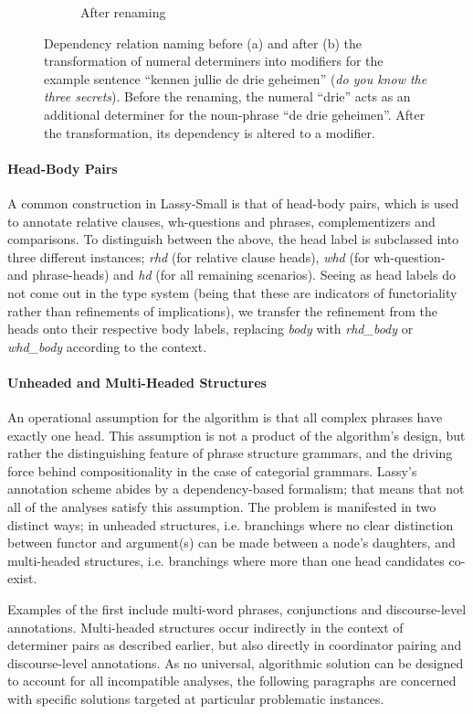 \begin{figure}[t]
\begin{subfigure}{0.49\textwidth}
        \caption{After renaming}
    \end{subfigure}
    \caption[Numeral Determiner Relabeling]{Dependency relation naming before (a) and after (b) the transformation of numeral determiners into modifiers for the example sentence ``kennen jullie de drie geheimen'' (\textit{do you know the three secrets}). Before the renaming, the numeral ``drie'' acts as an additional determiner for the noun-phrase ``de drie geheimen''. After the transformation, its dependency is altered to a modifier.}
    \label{fig:tw_to_mod}
\end{figure}

\paragraph{Head-Body Pairs}
A common construction in Lassy-Small is that of head-body pairs, which is used to annotate relative clauses, wh-questions and phrases, complementizers and comparisons.
To distinguish between the above, the head label is subclassed into three different instances; \textit{rhd} (for relative clause heads), \textit{whd} (for wh-question- and phrase-heads) and \textit{hd} (for all remaining scenarios).
Seeing as head labels do not come out in the type system (being that these are indicators of functoriality rather than refinements of implications), we transfer the refinement from the heads onto their respective body labels, replacing \textit{body} with \textit{rhd\_body} or \textit{whd\_body} according to the context.

\paragraph{Unheaded and Multi-Headed Structures}
An operational assumption for the algorithm is that all complex phrases have exactly one head.
This assumption is not a product of the algorithm's design, but rather the distinguishing feature of phrase structure grammars, and the driving force behind compositionality in the case of categorial grammars.
Lassy's annotation scheme abides by a dependency-based formalism; that means that not all of the analyses satisfy this assumption.
The problem is manifested in two distinct ways; in unheaded structures, i.e. branchings where no clear distinction between functor and argument(s) can be made between a node's daughters, and multi-headed structures, i.e. branchings where more than one head candidates co-exist.

Examples of the first include multi-word phrases, conjunctions and discourse-level annotations.
Multi-headed structures occur indirectly in the context of determiner pairs as described earlier, but also directly in coordinator pairing and discourse-level annotations.
As no universal, algorithmic solution can be designed to account for all incompatible analyses, the following paragraphs are concerned with specific solutions targeted at particular problematic instances.

